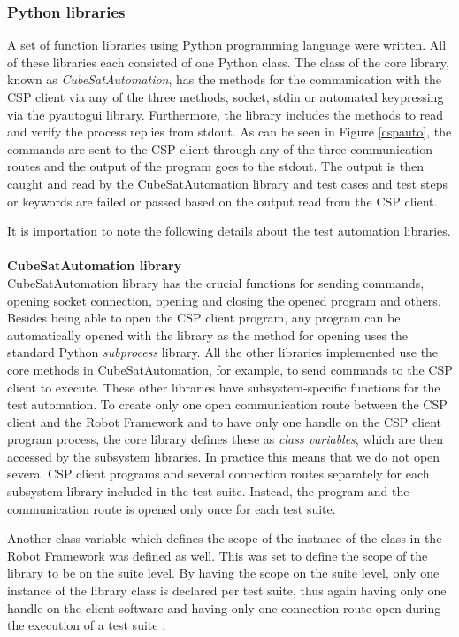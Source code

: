 \documentclass[english,12pt,a4paper,pdftex,elec,utf8]{aaltothesis}
\begin{document}
\subsubsection{Python libraries}
A set of function libraries using Python programming language were written. All of these libraries each consisted of one Python class. The class of the core library, known as \textit{CubeSatAutomation}, has the methods for the communication with the CSP client via any of the three methods, socket, stdin or automated keypressing via the pyautogui library. Furthermore, the library includes the methods to read and verify the process replies from stdout.
As can be seen in Figure \ref{cspauto}, the commands are sent to the CSP client through any of the three communication routes and the output of the program goes to the stdout. The output is then caught and read by the CubeSatAutomation library and test cases and test steps or keywords are failed or passed based on the output read from the CSP client. \par
It is importation to note the following details about the test automation libraries. 
\\
\\
\textbf{CubeSatAutomation library}\\
CubeSatAutomation library has the crucial functions for sending commands, opening socket connection, opening and closing the opened program and others. Besides being able to open the CSP client program, any program can be automatically opened with the library as the method for opening uses the standard Python \textit{subprocess} library. All the other libraries implemented use the core methods in CubeSatAutomation, for example, to send commands to the CSP client to execute. These other libraries have subsystem-specific functions for the test automation. To create only one open communication route between the CSP client and the Robot Framework and to have only one handle on the CSP client program process, the core library defines these as \textit{class variables}, which are then accessed by the subsystem libraries. In practice this means that we do not open several CSP client programs and several connection routes separately for each subsystem library included in the test suite. Instead, the program and the communication route is opened only once for each test suite.\par 
Another class variable which defines the scope of the instance of the class in the Robot Framework was defined as well. This was set to define the scope of the library to be on the suite level. By having the scope on the suite level, only one instance of the library class is declared per test suite, thus again having only one handle on the client software and having only one connection route open during the execution of a test suite \cite{robotuserguide}.\par 
\end{document}
